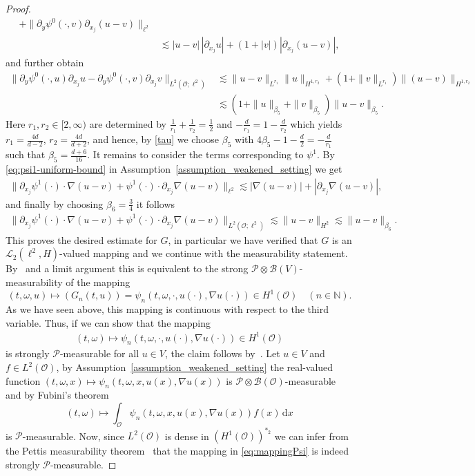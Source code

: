 \documentclass[reqno]{amsart}
\newcommand{\N}{\mathbb{N}}
\newcommand{\sP}{\mathscr{P}}
\newcommand{\sB}{\mathscr{B}}
\newcommand{\sL}{\mathscr{L}}
\newcommand{\sO}{\mathscr{O}}
\newcommand{\1}{\mathbf{1}}
\newcommand{\dx}{\,\mathrm{d}x}
\begin{document}
\begin{proof}
\begin{align*}
   + \|\partial_{y}\psi^0(\cdot,v)
   \partial_{x_j}(u-v) \|_{\ell^2}\\
   &\lesssim |u-v|\,|\partial_{x_j}u|
   +(1+|v|)|\partial_{x_j}(u-v)|,
\end{align*}
and further obtain
\begin{align*}
   \|\partial_{y}\psi^0(\cdot,u)\partial_{x_j}u
   -\partial_{y}\psi^0(\cdot,v)\partial_{x_j}v
   \|_{L^2(\sO;\ell^2)}
  &\lesssim
  \|u-v\|_{L^{r_1}}\|u\|_{H^{1,r_2}}
  +(1+\|v\|_{L^{r_1}})
  \|(u-v)\|_{H^{1,r_2}}\\
  &\lesssim
  (1+\|u\|_{\beta_5}+\|v\|_{\beta_5})
  \|u-v\|_{\beta_5}.
\end{align*}
Here $r_1,r_2\in [2,\infty)$ are determined by $\frac{1}{r_1}+\frac{1}{r_2}
    =\frac{1}{2}$ and $-\frac{d}{r_1}
    =1-\frac{d}{r_2}$ which yields 
$r_1=\frac{4d}{d-2}$, $r_2=\frac{4d}{d+2}$, and hence, by \eqref{tau} we choose
$\beta_5$ with
$ 
    4\beta_5-1-\frac{d}{2}
    =-\frac{d}{r_1}$ such that $ 
\beta_5=\frac{d+6}{16}$.
It remains to consider the terms corresponding to $\psi^1$. By \eqref{eq:psi1-uniform-bound} in Assumption~\ref{assumption_weakened_setting} we get
\begin{align*}
    \|\partial_{x_j}\psi^1(\cdot)\cdot\nabla(u-v)
    +\psi^1(\cdot)\cdot\partial_{x_j}\nabla(u-v)\|_{\ell^2} \lesssim |\nabla(u-v)|+|\partial_{x_j}\nabla(u-v)|,
\end{align*}
and finally by choosing $\beta_6=\frac34$ it follows
\begin{align*}
    \|\partial_{x_j}\psi^1(\cdot)\cdot\nabla(u-v)
    +\psi^1(\cdot)\cdot\partial_{x_j}\nabla(u-v)\|_{L^2(\sO;\ell^2)}\lesssim \|u-v\|_{H^2}
    \lesssim \|u-v\|_{\beta_6}.
\end{align*}
This proves the desired estimate for $G$, in particular we have verified that $G$ is an $\sL_2(\ell^2,H)$-valued mapping and we continue with the measurability statement. By~\cite[Example~9.1.16]{hytonenAnalysisBanachSpaces2017} and a limit argument this is equivalent to the strong $\sP\otimes \sB(V)$-measurability of the mapping 
\[ (t,\omega,u)\mapsto (G_n(t,u))=\psi_n(t,\omega,\cdot,u(\cdot),\nabla u(\cdot)) \in H^1(\sO) \quad (n\in \N). \]
As we have seen above, this mapping is continuous with respect to the third variable. Thus, if we can show that the mapping
\begin{align}\label{eq:mappingPsi}
    (t,\omega) \mapsto \psi_n(t,\omega,\cdot,u(\cdot),\nabla u(\cdot)) \in H^1(\sO) 
\end{align}
is strongly $\sP$-measurable for all $u\in V$, the claim follows by~\cite[Lemma~III.14]{castaingConvexAnalysisMeasurable1977}. Let $u\in V$ and $f\in L^2(\sO)$, by Assumption~\ref{assumption_weakened_setting} the real-valued function $(t,\omega,x)\mapsto \psi_n(t,\omega, x,u(x),\nabla u(x))$ is $\sP\otimes \sB(\sO)$-measurable and by Fubini's theorem 
\[ (t,\omega)\mapsto \int_\sO \psi_n(t,\omega,x,u(x),\nabla u(x))f(x) \dx\]
is $\sP$-measurable. Now, since $L^2(\sO) $ is dense in $(H^1(\sO))^{\ast_2}$ we can infer from the Pettis measurability theorem~\cite[Theorem~1.1.20]{hytonenAnalysisBanachSpaces2016} that the mapping in \eqref{eq:mappingPsi} is indeed strongly $\sP$-measurable.
\end{proof}
\end{document}
